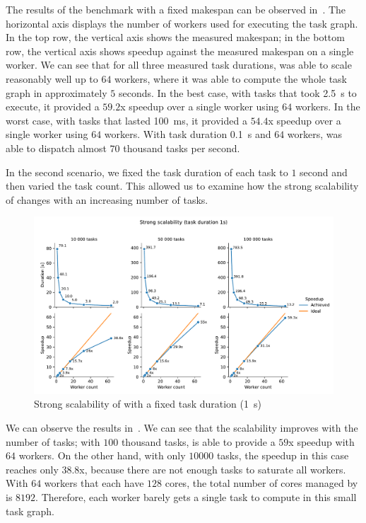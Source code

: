 The results of the benchmark with a fixed makespan can be observed in~. The
horizontal axis displays the number of workers used for executing the task graph. In the top row,
the vertical axis shows the measured makespan; in the bottom row, the vertical axis shows speedup
against the measured makespan on a single worker. We can see that for all three measured task
durations, \hyperqueue{} was able to scale reasonably well up to $64$
workers, where it was able to compute the whole task graph in approximately $5$
seconds. In the best case, with tasks that took \SI{2.5}{\second} to execute, it provided a
$59.2$x speedup over a single worker using $64$ workers. In the worst case, with
tasks that lasted \SI{100}{\milli\second}, it provided a $54.4$x speedup over a single worker using
$64$ workers. With task duration \SI{0.1}{\second} and
$64$ workers, \hyperqueue{} was able to dispatch almost
$70$ thousand tasks per second.

In the second scenario, we fixed the task duration of each task to $1$ second
and then varied the task count. This allowed us to examine how the strong scalability of
\hyperqueue{} changes with an increasing number of tasks.

\begin{figure}[h]
	\centering
	\includegraphics[width=\textwidth]{imgs/hq/charts/scalability-fixed-task-duration}
	\caption{Strong scalability of \hyperqueue{} with a fixed task duration (\SI{1}{\second})}
	\label{fig:hq-scalability-fixed-task-duration}
\end{figure}

We can observe the results in~. We can see that the scalability improves
with the number of tasks; with $100$ thousand tasks, \hyperqueue{} is
able to provide a $59$x speedup with $64$ workers. On the
other hand, with only $10000$ tasks, the speedup in this case reaches only
$38.8$x, because there are not enough tasks to saturate all workers. With
$64$ workers that each have $128$ cores, the total number of
cores managed by \hq{} is $8192$. Therefore, each worker barely gets a single task to compute in
this small task graph.

